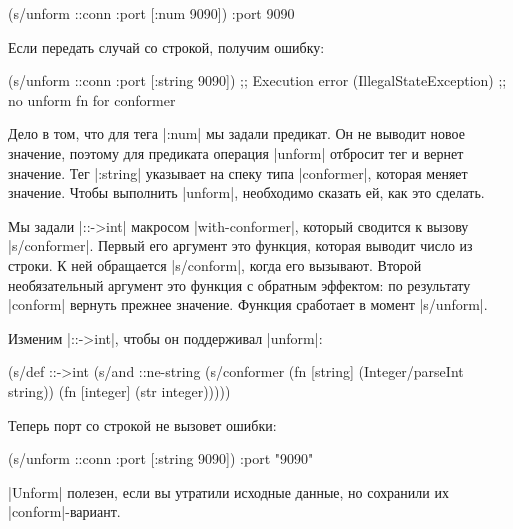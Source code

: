 \begin{english}
  \begin{clojure}
(s/unform ::conn {:port [:num 9090]})
{:port 9090}
  \end{clojure}
\end{english}

Если передать случай со строкой, получим ошибку:

\begin{english}
  \begin{clojure}
(s/unform ::conn {:port [:string 9090]})
;; Execution error (IllegalStateException)
;; no unform fn for conformer
  \end{clojure}
\end{english}

Дело в том, что для тега \spverb|:num| мы задали предикат. Он не выводит новое
значение, поэтому для предиката операция \spverb|unform| отбросит тег и вернет
значение. Тег \spverb|:string| указывает на спеку типа \spverb|conformer|,
которая меняет значение. Чтобы выполнить \spverb|unform|, необходимо сказать ей,
как это сделать.

Мы задали \spverb|::->int| макросом \spverb|with-conformer|, который сводится к
вызову \spverb|s/conformer|. Первый его аргумент это функция, которая выводит
число из строки. К ней обращается \spverb|s/conform|, когда его вызывают. Второй
необязательный аргумент это функция с обратным эффектом: по результату
\spverb|conform| вернуть прежнее значение. Функция сработает в момент
\spverb|s/unform|.

Изменим \spverb|::->int|, чтобы он поддерживал \spverb|unform|:

\begin{english}
  \begin{clojure}
(s/def ::->int
  (s/and
   ::ne-string
   (s/conformer
    (fn [string]
      (Integer/parseInt string))
    (fn [integer]
      (str integer)))))
  \end{clojure}
\end{english}

Теперь порт со строкой не вызовет ошибки:

\begin{english}
  \begin{clojure}
(s/unform ::conn {:port [:string 9090]})
{:port "9090"}
  \end{clojure}
\end{english}

\spverb|Unform| полезен, если вы утратили исходные данные, но сохранили их
\spverb|conform|-вариант.

